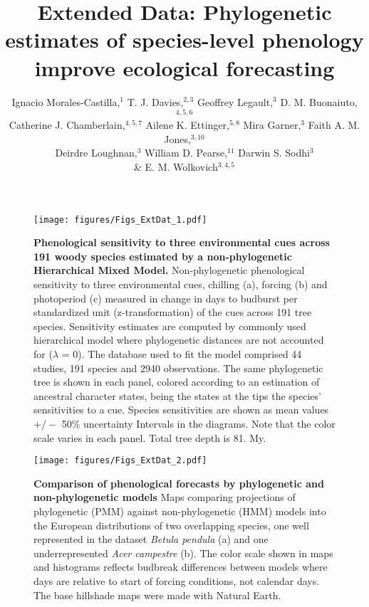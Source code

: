 \documentclass{article}
\begin{document}
%
\title{Extended Data: Phylogenetic estimates of species-level phenology improve ecological forecasting} 

\author{Ignacio Morales-Castilla,$^{1}$ T. J. Davies,$^{2,3}$ Geoffrey Legault,$^{3}$ D. M. Buonaiuto,$^{4,5,6}$ \\ Catherine J. Chamberlain,$^{4,5,7}$ Ailene K. Ettinger,$^{5,8}$ Mira Garner,$^{3}$ Faith A. M. Jones,$^{3,10}$ \\ Deirdre Loughnan,$^{3}$ William D. Pearse,$^{11}$ Darwin S. Sodhi$^{3}$ \\\& E. M. Wolkovich$^{3,4,5}$ }


 
\maketitle  
\renewcommand{\thefigure}{Extended Data \arabic{figure}}





\begin{figure}
\centering
  \noindent\texttt{[image: figures/Figs\_ExtDat\_1.pdf]}
  \caption{\textbf{Phenological sensitivity to three environmental cues across 191 woody species estimated by a non-phylogenetic Hierarchical Mixed Model.} Non-phylogenetic phenological sensitivity to three environmental cues, chilling (a), forcing (b) and photoperiod (c) measured in change in days to budburst per standardized unit (z-transformation) of the cues across 191 tree species. Sensitivity estimates are computed by commonly used hierarchical model where phylogenetic distances are not accounted for ($\lambda$ = 0). The database used to fit the model comprised 44 studies, 191 species and 2940 observations. The same phylogenetic tree is shown in each panel, colored according to an estimation of ancestral character states, being the states at the tips the species' sensitivities to a cue. Species sensitivities are shown as mean values $+/-$ 50\% uncertainty Intervals in the diagrams. Note that the color scale varies in each panel. Total tree depth is 81. My.}
  \label{fig:suppmuplot_all} 
\end{figure}

\clearpage


\begin{figure}
\centering
\noindent \texttt{[image: figures/Figs\_ExtDat\_2.pdf]}
  \caption{\textbf{Comparison of phenological forecasts by phylogenetic and non-phylogenetic models} Maps comparing projections of phylogenetic (PMM) against non-phylogenetic (HMM) models into the European distributions of two overlapping species, one well represented in the dataset \emph{Betula pendula} (a) and one underrepresented \emph{Acer campestre} (b). The color scale shown in maps and histograms reflects budbreak differences between models where days are relative to start of forcing conditions, not calendar days. The base hillshade maps were made with Natural Earth.}
  \label{fig:pmmvshmm}
\end{figure}
\clearpage
\end{document}
